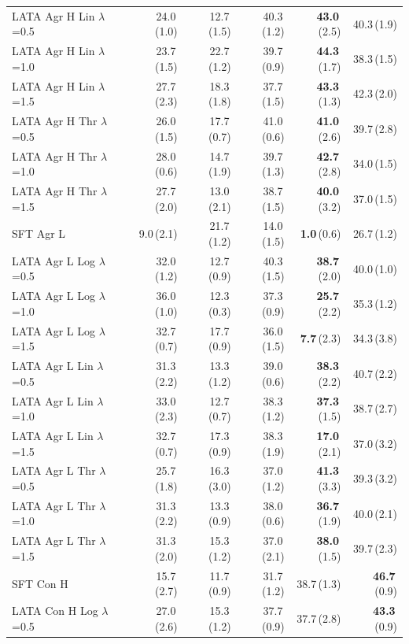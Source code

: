 \begin{longtable}{lrrrrr}
LATA Agr H Lin $\lambda$=0.5 & 24.0\,(1.0) & 12.7\,(1.5) & 40.3\,(1.2) & \textbf{43.0}\,(2.5) & 40.3\,(1.9) \\
LATA Agr H Lin $\lambda$=1.0 & 23.7\,(1.5) & 22.7\,(1.2) & 39.7\,(0.9) & \textbf{44.3}\,(1.7) & 38.3\,(1.5) \\
LATA Agr H Lin $\lambda$=1.5 & 27.7\,(2.3) & 18.3\,(1.8) & 37.7\,(1.5) & \textbf{43.3}\,(1.3) & 42.3\,(2.0) \\
LATA Agr H Thr $\lambda$=0.5 & 26.0\,(1.5) & 17.7\,(0.7) & 41.0\,(0.6) & \textbf{41.0}\,(2.6) & 39.7\,(2.8) \\
LATA Agr H Thr $\lambda$=1.0 & 28.0\,(0.6) & 14.7\,(1.9) & 39.7\,(1.3) & \textbf{42.7}\,(2.8) & 34.0\,(1.5) \\
LATA Agr H Thr $\lambda$=1.5 & 27.7\,(2.0) & 13.0\,(2.1) & 38.7\,(1.5) & \textbf{40.0}\,(3.2) & 37.0\,(1.5) \\
SFT Agr L & 9.0\,(2.1) & 21.7\,(1.2) & 14.0\,(1.5) & \textbf{1.0}\,(0.6) & 26.7\,(1.2) \\
LATA Agr L Log $\lambda$=0.5 & 32.0\,(1.2) & 12.7\,(0.9) & 40.3\,(1.5) & \textbf{38.7}\,(2.0) & 40.0\,(1.0) \\
LATA Agr L Log $\lambda$=1.0 & 36.0\,(1.0) & 12.3\,(0.3) & 37.3\,(0.9) & \textbf{25.7}\,(2.2) & 35.3\,(1.2) \\
LATA Agr L Log $\lambda$=1.5 & 32.7\,(0.7) & 17.7\,(0.9) & 36.0\,(1.5) & \textbf{7.7}\,(2.3) & 34.3\,(3.8) \\
LATA Agr L Lin $\lambda$=0.5 & 31.3\,(2.2) & 13.3\,(1.2) & 39.0\,(0.6) & \textbf{38.3}\,(2.2) & 40.7\,(2.2) \\
LATA Agr L Lin $\lambda$=1.0 & 33.0\,(2.3) & 12.7\,(0.7) & 38.3\,(1.2) & \textbf{37.3}\,(1.5) & 38.7\,(2.7) \\
LATA Agr L Lin $\lambda$=1.5 & 32.7\,(0.7) & 17.3\,(0.9) & 38.3\,(1.9) & \textbf{17.0}\,(2.1) & 37.0\,(3.2) \\
LATA Agr L Thr $\lambda$=0.5 & 25.7\,(1.8) & 16.3\,(3.0) & 37.0\,(1.2) & \textbf{41.3}\,(3.3) & 39.3\,(3.2) \\
LATA Agr L Thr $\lambda$=1.0 & 31.3\,(2.2) & 13.3\,(0.9) & 38.0\,(0.6) & \textbf{36.7}\,(1.9) & 40.0\,(2.1) \\
LATA Agr L Thr $\lambda$=1.5 & 31.3\,(2.0) & 15.3\,(1.2) & 37.0\,(2.1) & \textbf{38.0}\,(1.5) & 39.7\,(2.3) \\
SFT Con H & 15.7\,(2.7) & 11.7\,(0.9) & 31.7\,(1.2) & 38.7\,(1.3) & \textbf{46.7}\,(0.9) \\
LATA Con H Log $\lambda$=0.5 & 27.0\,(2.6) & 15.3\,(1.2) & 37.7\,(0.9) & 37.7\,(2.8) & \textbf{43.3}\,(0.9) \\

\end{longtable}
